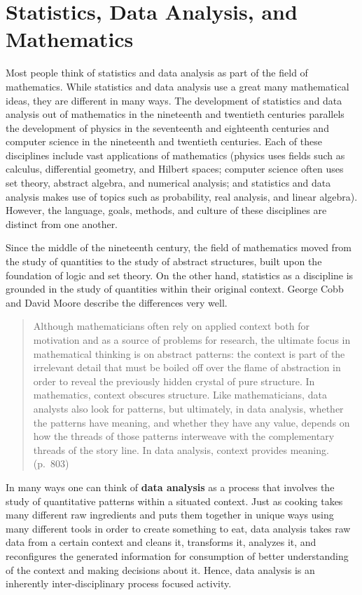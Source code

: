 \documentclass[
]{book}
\theoremstyle{definition}
\theoremstyle{definition}
\theoremstyle{definition}
\theoremstyle{definition}
\theoremstyle{remark}
\begin{document}
\hypertarget{statistics-data-analysis-and-mathematics}{%
\section{Statistics, Data Analysis, and Mathematics}\label{statistics-data-analysis-and-mathematics}}

Most people think of statistics and data analysis as part of the field of mathematics. While statistics and data analysis use a great many mathematical ideas, they are different in many ways. The development of statistics and data analysis out of mathematics in the nineteenth and twentieth centuries parallels the development of physics in the seventeenth and eighteenth centuries and computer science in the nineteenth and twentieth centuries. Each of these disciplines include vast applications of mathematics (physics uses fields such as calculus, differential geometry, and Hilbert spaces; computer science often uses set theory, abstract algebra, and numerical analysis; and statistics and data analysis makes use of topics such as probability, real analysis, and linear algebra). However, the language, goals, methods, and culture of these disciplines are distinct from one another.

Since the middle of the nineteenth century, the field of mathematics moved from the study of quantities to the study of abstract structures, built upon the foundation of logic and set theory. On the other hand, statistics as a discipline is grounded in the study of quantities within their original context. George Cobb and David Moore \citeyearpar{Cobb1997} describe the differences very well.

\begin{quote}
Although mathematicians often rely on applied context both for motivation and as a source of problems for research, the ultimate focus in mathematical thinking is on abstract patterns: the context is part of the irrelevant detail that must be boiled off over the flame of abstraction in order to reveal the previously hidden crystal of pure structure. In mathematics, context obscures structure. Like mathematicians, data analysts also look for patterns, but ultimately, in data analysis, whether the patterns have meaning, and whether they have any value, depends on how the threads of those patterns interweave with the complementary threads of the story line. In data analysis, context provides meaning. (p.~803)
\end{quote}

In many ways one can think of \textbf{data analysis} as a process that involves the study of quantitative patterns within a situated context. Just as cooking takes many different raw ingredients and puts them together in unique ways using many different tools in order to create something to eat, data analysis takes raw data from a certain context and cleans it, transforms it, analyzes it, and reconfigures the generated information for consumption of better understanding of the context and making decisions about it. Hence, data analysis is an inherently inter-disciplinary process focused activity.
\end{document}
